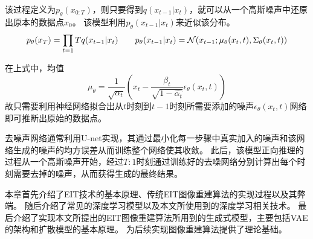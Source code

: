 该过程定义为$p_\theta(x_{0:T})$，则只要得到$q(x_{t-1}|x_t)$，就可以从一个高斯噪声中还原出原本的数据点$x_0$。
该模型利用$p_\theta(x_{t-1}|x_{t})$来近似该分布。
\begin{equation}
  \centering
  p_\theta(x_{T}) = \prod_{t=1}{T} q(x_{t-1}|x_{t}) \qquad
  p_\theta(x_{t-1}|x_{t}) = \mathcal{N}(x_{t-1}; \mu_\theta(x_t, t), \Sigma_\theta(x_t, t))
\end{equation}

在上式中，均值
\begin{equation}
  \mu_\theta = \frac{1}{\sqrt{\alpha_t}}(x_t - \frac{\beta_t}{\sqrt{1-\hat{\alpha_t}}}\epsilon_\theta(x_t, t))  
\end{equation}
故只需要利用神经网络拟合出从$t$时刻到$t-1$时刻所需要添加的噪声$\epsilon_\theta(x_t, t)$网络即可推断出原始的数据点。

去噪声网络通常利用U-net实现，其通过最小化每一步骤中真实加入的噪声和该网络生成的噪声的均方误差从而训练整个网络使其收敛。
此后，该模型正向推理的过程从一个高斯噪声开始，经过$T:1$时刻通过训练好的去噪网络分别计算出每个时刻需要去掉的噪声，从而获得生成的最终结果。


本章首先介绍了EIT技术的基本原理、传统EIT图像重建算法的实现过程以及其弊端。
随后介绍了常见的深度学习模型以及本文所使用到的深度学习相关技术。
最后介绍了实现本文所提出的EIT图像重建算法所用到的生成式模型，主要包括VAE的架构和扩散模型的基本原理。
为后续实现图像重建算法提供了理论基础。
